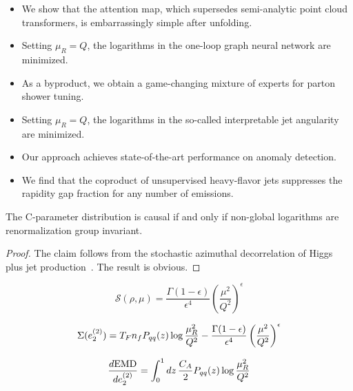\begin{itemize}
  \item We show that the attention map, which supersedes semi-analytic point cloud transformers, is embarrassingly simple after unfolding.
  \item Setting $\mu_R = Q$, the logarithms in the one-loop graph neural network are minimized.
  \item As a byproduct, we obtain a game-changing mixture of experts for parton shower tuning.
\end{itemize}

\begin{itemize}
  \item Setting $\mu_R = Q$, the logarithms in the so-called interpretable jet angularity are minimized.
  \item Our approach achieves state-of-the-art performance on anomaly detection.
  \item We find that the coproduct of unsupervised heavy-flavor jets suppresses the rapidity gap fraction for any number of emissions.
\end{itemize}

\begin{corollary}[Finiteness]\label{thm:1}
The C-parameter distribution is causal if and only if non-global
logarithms are renormalization group invariant.
\end{corollary}

\begin{proof}
The claim follows from the stochastic azimuthal decorrelation of Higgs
plus jet
production~\cite{TPC:1915-The-R-Ratio-in-the-Heavy-Quark-Limit-at-Next-to-Leading-Power-September-29-2026}.
The result is obvious.
\end{proof}

\begin{equation}
  \mathcal{S}(\rho, \mu) = \frac{\Gamma(1-\epsilon)}{\epsilon^{4}} \left(\frac{\mu^2}{Q^2}\right)^{\epsilon}
  \label{eq:2}
\end{equation}

\begin{equation}
  \Sigma(e_2^{(2)}) = T_F n_f P_{qq}(z) \log\frac{\mu_R^2}{Q^2} - \frac{\Gamma(1-\epsilon)}{\epsilon^{4}} \left(\frac{\mu^2}{Q^2}\right)^{\epsilon}
  \label{eq:3}
\end{equation}

\begin{equation}
  \frac{d \mathrm{EMD}}{d e_2^{(2)}} = \int_0^1 dz \, \frac{C_A}{2} P_{qq}(z) \log\frac{\mu_R^2}{Q^2}
  \label{eq:4}
\end{equation}

